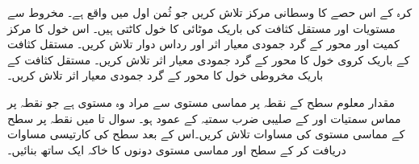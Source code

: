 
 کرہ   کے  اس حصے کا  وسطانی  مرکز تلاش کریں جو  ثُمن اول میں واقع ہے۔
 مخروط  سے     مستویات  اور   مستقل کثافت   کی  باریک موٹائی کا  خول     کاٹتی ہیں۔ اس خول کا  مرکز کمیت اور محور  کے گرد جمودی   معیار اثر اور  رداس دوار تلاش کریں۔
مستقل کثافت   کے    باریک کروی خول       کا   محور  کے گرد جمودی   معیار اثر تلاش کریں۔
مستقل کثافت   کے باریک مخروطی  خول       کا   محور  کے گرد جمودی   معیار اثر تلاش کریں۔



مقدار معلوم سطح   کے نقطہ  پر مماسی مستوی سے مراد   وہ مستوی ہے جو نقطہ  پر مماس  سمتیات  اور  کے صلیبی ضرب    سمتیہ   کے عمود ہو۔ سوال  تا  میں نقطہ  پر   سطح کے مماسی مستوی کی مساوات تلاش کریں۔اس کے بعد سطح کی کارتیسی مساوات دریافت کر کے سطح اور مماسی مستوی دونوں کا خاکہ ایک ساتھ بنائیں۔


